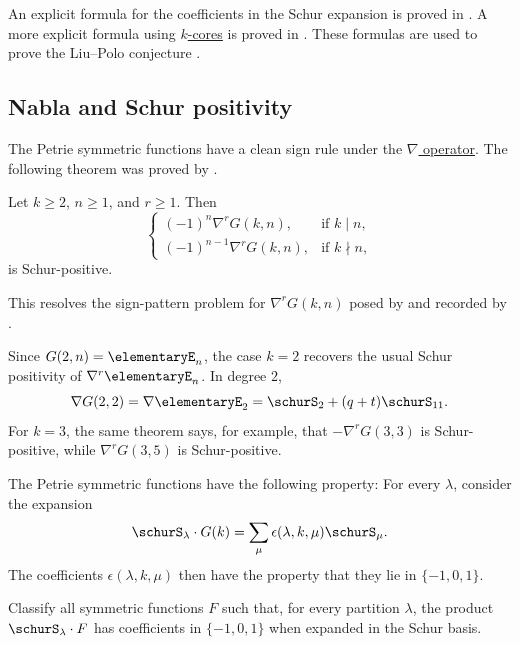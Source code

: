 An explicit formula for the coefficients in the Schur expansion is proved in
\cite{Grinberg2020}.
A more explicit formula using \hyperref[partitionQuotient]{$k$-cores} is
proved in \cite{ChengChouEuFuYao2022x}.
These formulas are used to prove the Liu--Polo conjecture
\cite[Rem.~1.4.5]{LiuPolo2021}.

\subsection[petrieNabla]{Nabla and Schur positivity}

The Petrie symmetric functions have a clean sign rule under the
\hyperref[nablaOperator]{$\nabla$ operator}.
The following theorem was proved by 
\cite{Qu2026xPetrieNabla}.

\begin{theorem}[Qu]
Let $k\geq 2$, $n\geq 1$, and $r\geq 1$.  Then
\[
\begin{cases}
(-1)^n \nabla^r G(k,n), & \text{if } k\mid n,\\
(-1)^{n-1} \nabla^r G(k,n), & \text{if } k\nmid n,
\end{cases}
\]
is Schur-positive.
\end{theorem}

This resolves the sign-pattern problem for $\nabla^r G(k,n)$ posed by
 and recorded by 
\cite[Conj.~5.2]{Grinberg2020x}.

\begin{example*}
Since $G(2,n)=\elementaryE_n$, the case $k=2$ recovers the usual
Schur positivity of $\nabla^r\elementaryE_n$.  In degree $2$,
\[
\nabla G(2,2)
=
\nabla \elementaryE_2
=
\schurS_2 + (q+t)\schurS_{11}.
\]
For $k=3$, the same theorem says, for example, that
$-\nabla^r G(3,3)$ is Schur-positive, while
$\nabla^r G(3,5)$ is Schur-positive.
\end{example*}


The Petrie symmetric functions have the following property:
For every $\lambda$, consider the expansion
\[
\schurS_\lambda \cdot G(k) = \sum_\mu \epsilon(\lambda,k,\mu) \schurS_\mu.
\]
The coefficients $\epsilon(\lambda,k,\mu)$
then have the property that they lie in $\{-1,0,1\}$.

\begin{problem}
Classify all symmetric functions $F$ such that,
for every partition $\lambda$, the product $\schurS_\lambda \cdot F$
has coefficients in $\{-1,0,1\}$ when expanded in the Schur basis.
\end{problem}


